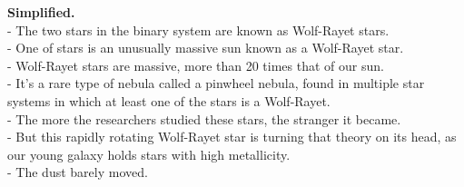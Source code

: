 \documentclass[10pt]{article}
\begin{document}
\textbf{Simplified.}\\
- {\color{blue}The two stars in the binary system are known as Wolf-Rayet stars.}\\
- One of stars is an unusually massive sun known as a Wolf-Rayet star. \\
- Wolf-Rayet stars are massive, more than 20 times that of our sun.\\ - It's a rare type of nebula called a pinwheel nebula, found in multiple star systems in which at least one of the stars is a Wolf-Rayet.\\
- The more the researchers studied these stars, the stranger it became. \\
- But this rapidly rotating Wolf-Rayet star is turning that theory on its head, as our young galaxy holds stars with high metallicity.\\
- The dust barely moved.
\end{document}
